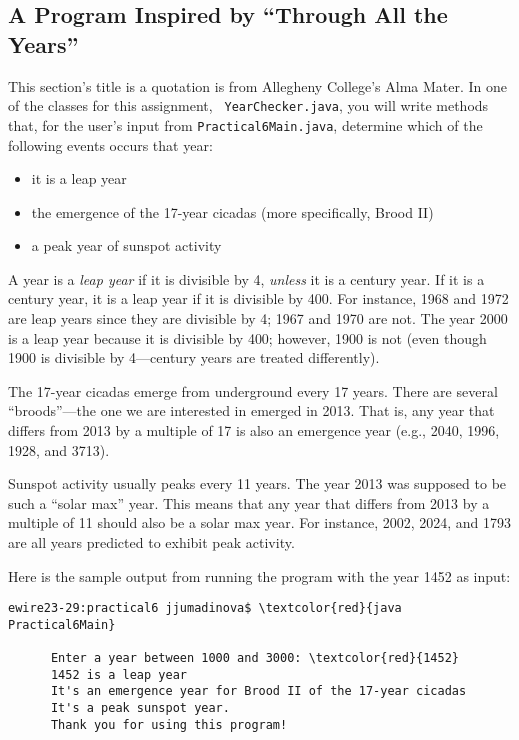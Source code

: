 \vspace*{-.1in}
\subsection*{A Program Inspired by ``Through All the Years''}
\vspace*{-.05in}

This section's title is a quotation is from Allegheny College's Alma Mater. In one of the classes for this assignment, {\tt
YearChecker.java}, you will write methods that, for the user's input from {\tt Practical6Main.java}, determine which of
the following events occurs that year: \begin{itemize}

\item
it is a leap year

\item
the emergence of the 17-year cicadas (more specifically, Brood II)

\item
a peak year of sunspot activity

\end{itemize}

\noindent A year is a {\em leap year} if it is divisible by 4, {\em unless} it is a century year. If it is a century
year, it is a leap year if it is divisible by 400. For instance, 1968 and 1972 are leap years since they are divisible
by 4; 1967 and 1970 are not.  The year 2000 is a leap year because it is divisible by 400; however, 1900 is not (even
though 1900 is divisible by 4---century years are treated differently).

\noindent The 17-year cicadas emerge from underground every 17 years. There are several ``broods''---the one we are
interested in emerged in 2013. That is, any year that differs from 2013 by a multiple of 17 is also an emergence year (e.g.,
2040, 1996, 1928, and 3713).

\noindent Sunspot activity usually peaks every 11 years. The year 2013 was supposed to be such a ``solar max'' year.
This means that any year that differs from 2013 by a multiple of 11 should also be a solar max year. For instance, 2002,
2024, and 1793 are all years predicted to exhibit peak activity.

\noindent Here is the sample output from running the program with the year 1452 as input:

\begin{Verbatim}[commandchars=\\\{\}]
      ewire23-29:practical6 jjumadinova$ \textcolor{red}{java Practical6Main}
            
      Enter a year between 1000 and 3000: \textcolor{red}{1452}
      1452 is a leap year
      It's an emergence year for Brood II of the 17-year cicadas
      It's a peak sunspot year.
      Thank you for using this program! 
\end{Verbatim}


